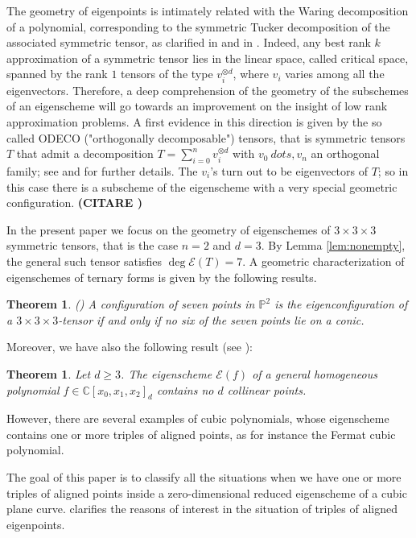 \documentclass{amsart}
\theoremstyle{plain}
\newtheorem{theorem}[lemma]{Theorem}
\theoremstyle{definition}
\newcommand{\C}{\mathbb{C}}
\newcommand{\p}{\mathbb{P}}
\newcommand{\Eig}[1]{\mathcal{E}\!\left( {#1} \right)}
\begin{document}
The geometry of eigenpoints is intimately related with the Waring decomposition of a polynomial,
corresponding to the symmetric Tucker decomposition of the associated symmetric tensor,
as clarified
in \cite{DOT} and in \cite{Ott}. Indeed, any best rank $k$ approximation of a symmetric tensor lies in the linear
space, called {critical space},  spanned by the rank $1$ tensors of the type $v_i ^{\otimes d}$, where $v_i$ varies among all the eigenvectors. Therefore, a deep comprehension of the geometry of the subschemes of an eigenscheme will
go towards an improvement on the insight of low rank approximation problems. A first evidence in this direction is given by the so called ODECO ("orthogonally decomposable") tensors, that is symmetric tensors~$T$ that admit a decomposition
$T= \sum _{i=0}^n v_i ^{\otimes d}$ with $v_0 \ dots , v_n$ an orthogonal family; see \cite{Rob} and \cite{BDHE}
for further details. The $v_i$'s turn out to be eigenvectors of $T$; so in this case there is a subscheme of the eigenscheme with a very special geometric configuration.
\textbf{(CITARE \cite{Ottaviani24})}

 In the present paper we focus on the geometry of eigenschemes of $3\times 3 \times 3$ symmetric tensors, that is the case $n=2$ and $d=3$. By Lemma \ref{lem:nonempty}, the general such tensor
 satisfies $\deg \Eig{T}=7$. A geometric characterization of eigenschemes of ternary forms is given by the following results.

\begin{theorem} (\cite[Theorem 5.1]{ASS})
A configuration of seven points in $\p^2$ is the eigenconfiguration
of a $3\times 3 \times 3$-tensor if and only if no six of the seven points lie on a conic.
\end{theorem}

Moreover, we have also the following result (see \cite[Theorem 5.7]{BGV}):
\begin{theorem}
\label{thm:general_no_d_collinear}
Let $d\ge 3$. The eigenscheme $\Eig{f}$ of a general homogeneous polynomial $f \in \C[x_0,x_1,x_2]_d$ contains no $d$ collinear points.
\end{theorem}

However, there are several examples of cubic polynomials, whose eigenscheme contains one or more triples of aligned points, as for instance the Fermat cubic polynomial.

The goal of this paper is to classify all the situations when we have one or more triples of aligned points inside a zero-dimensional reduced eigenscheme of a cubic plane curve.
 clarifies the reasons of interest in the situation of triples of aligned eigenpoints.
\end{document}
